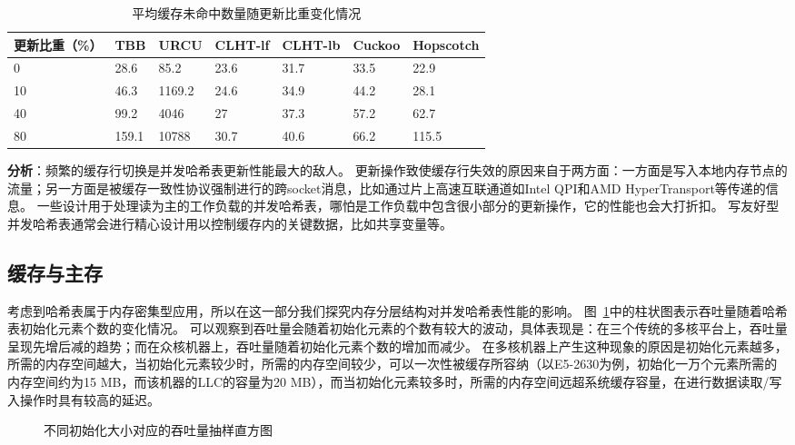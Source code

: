 \begin{table}[htbp]
  \centering
  \caption{平均缓存未命中数量随更新比重变化情况}
  \label{tab:cache_misses_update}
  \begin{tabular}{lllllll}
    \toprule
       更新比重（\%） & TBB & URCU & CLHT-lf & CLHT-lb & Cuckoo & Hopscotch  \\
    \midrule
     0 & 28.6 & 85.2 & 23.6 & 31.7 & 33.5 & 22.9  \\
      10 & 46.3 & 1169.2 & 24.6 & 34.9 & 44.2 & 28.1 \\
      40 & 99.2 & 4046 & 27 & 37.3 & 57.2 & 62.7 \\
      80 & 159.1 & 10788 & 30.7 & 40.6 & 66.2 & 115.5  \\
    \bottomrule
  \end{tabular}
  \label{tab:cache_miss_update}
\end{table}

\textbf{分析}：频繁的缓存行切换是并发哈希表更新性能最大的敌人。
更新操作致使缓存行失效的原因来自于两方面：一方面是写入本地内存节点的流量；另一方面是被缓存一致性协议强制进行的跨socket消息，比如通过片上高速互联通道如Intel QPI和AMD HyperTransport等传递的信息。
一些设计用于处理读为主的工作负载的并发哈希表，哪怕是工作负载中包含很小部分的更新操作，它的性能也会大打折扣。
写友好型并发哈希表通常会进行精心设计用以控制缓存内的关键数据，比如共享变量等。

\subsection{缓存与主存}
考虑到哈希表属于内存密集型应用，所以在这一部分我们探究内存分层结构对并发哈希表性能的影响。
图~\ref{fig:initial_size}中的柱状图表示吞吐量随着哈希表初始化元素个数的变化情况。
可以观察到吞吐量会随着初始化元素的个数有较大的波动，具体表现是：在三个传统的多核平台上，吞吐量呈现先增后减的趋势；而在众核机器上，吞吐量随着初始化元素个数的增加而减少。
在多核机器上产生这种现象的原因是初始化元素越多，所需的内存空间越大，当初始化元素较少时，所需的内存空间较少，可以一次性被缓存所容纳（以E5-2630为例，初始化一万个元素所需的内存空间约为15 MB，而该机器的LLC的容量为20 MB），而当初始化元素较多时，所需的内存空间远超系统缓存容量，在进行数据读取/写入操作时具有较高的延迟。

\begin{figure}[htbp]
\centering
\caption{不同初始化大小对应的吞吐量抽样直方图}
\label{fig:initial_size}
\end{figure}

